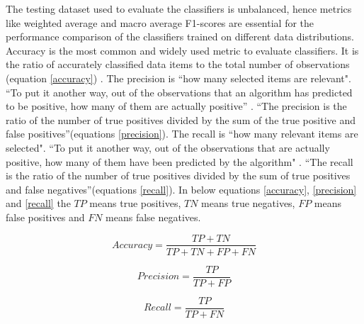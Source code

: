 The testing dataset used to evaluate the classifiers is unbalanced, hence metrics like weighted average and macro average F1-scores are essential for the performance comparison of the classifiers trained on different data distributions. Accuracy is the most common and widely used metric to evaluate classifiers. It is the ratio of accurately classified data items to the total number of observations (equation \ref{accuracy}) \cite{vakili2020performance}. The precision is ``how many selected items are relevant"\footnotemark. ``To put it another way, out of the observations that an algorithm has predicted to be positive, how many of them are actually positive'' \cite{vakili2020performance}. ``The precision is the ratio of the number of true positives divided by the sum of the true positive and false positives''\footnotemark (equations \ref{precision}). The recall is ``how many relevant items are selected"\footnotemark[\value{footnote}]. ``To put it another way, out of the observations that are actually positive, how many of them have been predicted by the algorithm" \cite{vakili2020performance}. ``The recall is the ratio of the number of true positives divided by the sum of true positives and false negatives''\footnotemark[\value{footnote}] (equations \ref{recall}). In below equations \ref{accuracy},  \ref{precision} and \ref{recall} the $TP$ means true positives, $TN$ means true negatives, $FP$ means false positives and $FN$ means false negatives.




\begin{equation}\label{accuracy}
\textit{Accuracy} = \frac{TP + TN}{TP +TN+ FP + FN}
\end{equation}

\begin{equation}\label{precision}
\textit{Precision} = \frac{TP}{TP + FP}
\end{equation}

\begin{equation}\label{recall}
\textit{Recall} = \frac{TP}{TP + FN}
\end{equation}

